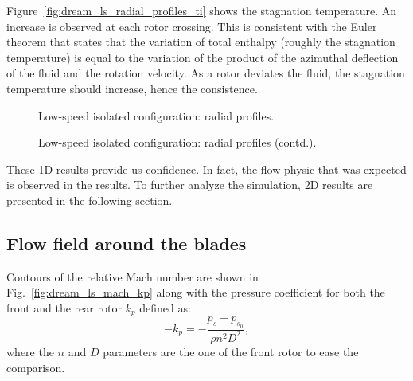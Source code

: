 Figure~\ref{fig:dream_ls_radial_profiles_ti}
shows the stagnation temperature.
An increase is observed at each 
rotor crossing. This is consistent with the
Euler theorem that states that the variation of total enthalpy (roughly
the stagnation temperature) is equal to the variation of the product of
the azimuthal deflection of the fluid and the rotation velocity. As a rotor
deviates the fluid, the stagnation temperature should increase, 
hence the consistence.
\begin{figure}
  \centering
  \caption{Low-speed isolated configuration: radial profiles.}
\end{figure}
\begin{figure}
  \centering
  \setcounter{subfigure}{3}
  \caption{Low-speed isolated configuration: radial profiles (contd.).}
  \label{fig:dream_ls_radial_profiles}
\end{figure}

These 1D results provide us confidence. In fact, the flow physic that
was expected is observed in the results. To further analyze the simulation,
2D results are presented in the following section.

\subsection{Flow field around the blades}
\label{sub:dream_ls_flow_field}

Contours of the relative Mach number are shown in 
Fig.~\ref{fig:dream_ls_mach_kp} along with the pressure coefficient
for both the front and the rear rotor
$k_p$ defined as:
\begin{equation}
   -k_p = - \frac{p_s - p_{s_0}}{\rho n^2 D^2},
\end{equation}
where the $n$ and $D$ parameters are the one of the front rotor
to ease the comparison.

